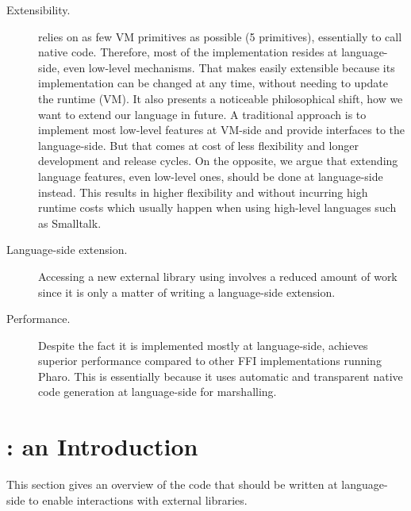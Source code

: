 \begin{description}
	\item[Extensibility.] \NBFFI relies on as few VM primitives as possible (5 primitives), essentially to call native code.  Therefore, most of the implementation resides at language-side, even low-level mechanisms. That makes \NBFFI easily extensible because its implementation can be changed at any time, without needing to update the runtime (VM). It also presents a noticeable philosophical shift, how we want to extend our language in future. A traditional approach is to implement most low-level features at VM-side and provide interfaces to the language-side.
But that comes at cost of less flexibility and longer development and release cycles. On the opposite, we argue that extending language features, even low-level ones, should be done at language-side instead. This results in higher flexibility and without incurring high runtime costs which usually happen when using high-level languages such as Smalltalk.
	\item[Language-side extension.] Accessing a new external library using \NBFFI involves a reduced amount of work since it is only a matter of writing a language-side extension.
	\item[Performance.] Despite the fact it is implemented mostly at language-side, \NBFFI achieves superior performance compared to other FFI implementations running Pharo.
    This is essentially because it uses automatic and transparent native code generation at language-side for marshalling.
\end{description}



\section{\NBFFI: an Introduction}

This section gives an overview of the code that should be written at language-side
to enable interactions with external libraries.

